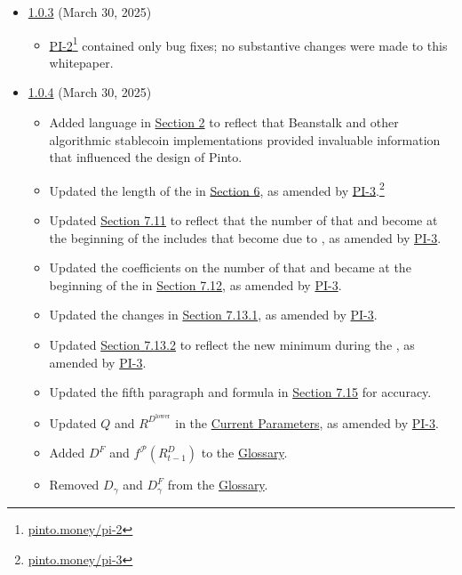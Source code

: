 \documentclass[class=article, crop=false]{standalone}
\begin{document}
\begin{itemize}[topsep=0pt, itemsep=3pt,leftmargin=16pt]
    \item \href{https://github.com/pinto-org/whitepaper/blob/master/version-history/pinto1_0_3.pdf}{1.0.3} (March 30, 2025)
    
    \begin{itemize}
        \item \href{https://pinto.money/pi-2}{PI-2}\footnote{\href{https://pinto.money/pi-2}{pinto.money/pi-2}} contained only bug fixes; no substantive changes were made to this whitepaper.
    \end{itemize}

    \item \href{https://github.com/pinto-org/whitepaper/blob/master/version-history/pinto1_0_4.pdf}{1.0.4} (March 30, 2025)
    
    \begin{itemize}
        \item Added language in \hyperlink{section.2}{Section 2} to reflect that Beanstalk and other algorithmic stablecoin implementations provided invaluable information that influenced the design of Pinto.
        \item Updated the length of the  in \hyperlink{section.6}{Section 6}, as amended by \href{https://pinto.money/pi-3}{PI-3}.\footnote{\href{https://pinto.money/pi-3}{pinto.money/pi-3}}
        \item Updated \hyperlink{subsection.7.11}{Section 7.11} to reflect that the number of  that  and become  at the beginning of the  includes  that become  due to , as amended by \href{https://pinto.money/pi-3}{PI-3}.
        \item Updated the coefficients on the number of  that  and became  at the beginning of the  in \hyperlink{subsection.7.12}{Section 7.12}, as amended by \href{https://pinto.money/pi-3}{PI-3}.
        \item Updated the  changes in \hyperlink{subsubsection.7.13.1}{Section 7.13.1}, as amended by \href{https://pinto.money/pi-3}{PI-3}.
        \item Updated \hyperlink{subsubsection.7.13.2}{Section 7.13.2} to reflect the new minimum  during the , as amended by \href{https://pinto.money/pi-3}{PI-3}.
        \item Updated the fifth paragraph and formula in \hyperlink{subsection.7.15}{Section 7.15} for accuracy.
        \item Updated $Q$ and $R^{D^{\text{lower}}}$ in the \hyperlink{subsection.12.1}{Current Parameters},  as amended by \href{https://pinto.money/pi-3}{PI-3}.
        \item Added $D^{F}$ and $f^{\mathscr{P}}(R_{t-1}^{D})$ to the \hyperlink{subsection.12.14}{Glossary}.
        \item Removed $D_{\gamma}$ and $D_{\gamma}^{F}$ from the \hyperlink{subsection.12.14}{Glossary}.
    \end{itemize}
    
\end{itemize}
\end{document}
